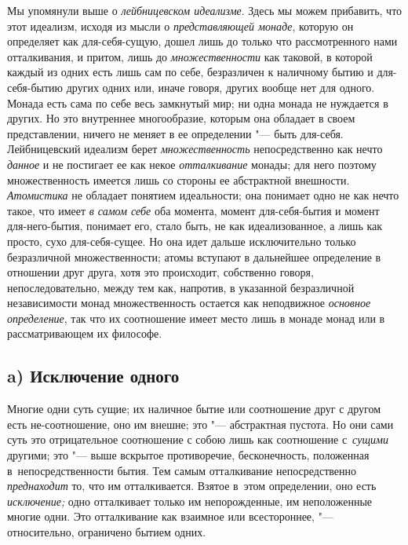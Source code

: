
Мы упомянули выше о {\em лейбницевском идеализме}. Здесь
мы можем прибавить, что этот идеализм, исходя из мысли о
{\em представляющей монаде}, которую он определяет как
для-себя-сущую, дошел лишь до только что рассмотренного нами отталкивания,
и притом, лишь до {\em множественности} как таковой, в
которой каждый из одних есть лишь сам по себе, безразличен к наличному
бытию и для-себя-бытию других одних или, иначе говоря, других вообще нет
для одного. Монада есть сама по себе весь замкнутый мир; ни одна монада не
нуждается в других. Но это внутреннее многообразие, которым она обладает в
своем представлении, ничего не меняет в ее определении "--- быть для-себя.
Лейбницевский идеализм берет {\em множественность}
непосредственно как нечто {\em данное} и не постигает
ее как некое {\em отталкивание} монады; для него
поэтому множественность имеется лишь со стороны ее абстрактной внешности.
{\em Атомистика} не обладает понятием идеальности; она
понимает одно не как нечто такое, что имеет {\em в
самом себе} оба момента, момент для-себя-бытия и момент для-него-бытия,
понимает его, стало быть, не как идеализованное, а лишь как просто, сухо
для-себя-сущее. Но она идет дальше исключительно только безразличной
множественности; атомы вступают в дальнейшее определение в отношении друг
друга, хотя это происходит, собственно говоря, непоследовательно, между тем
как, напротив, в указанной безразличной независимости монад множественность
остается как неподвижное {\em основное определение},
так что их соотношение имеет место лишь в монаде монад или в
рассматривающем их философе.

\bigskip


\subsection[a) Исключение одного]{a) Исключение одного}

Многие одни суть сущие; их наличное бытие или соотношение друг с другом есть
не-соотношение, оно им внешне; это "--- абстрактная пустота. Но они сами суть
это отрицательное соотношение с собою лишь как соотношение с~{\em сущими}
другими; это "--- выше вскрытое противоречие, бесконечность, положенная
в~непосредственности бытия. Тем самым отталкивание непосредственно {\em
преднаходит} то, что им отталкивается. Взятое в~этом определении, оно есть
{\em исключение;} одно отталкивает только им непорожденные, им неположенные
многие одни. Это отталкивание как взаимное или всестороннее, "--- относительно,
ограничено бытием одних.

